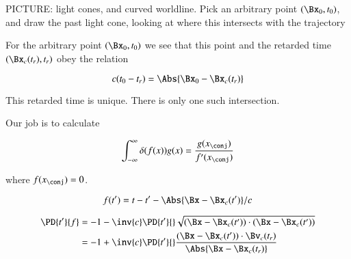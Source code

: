 PICTURE: light cones, and curved worldline.  Pick an arbitrary point $(\Bx_0, t_0)$, and draw the past light cone, looking at where this intersects with the trajectory

For the arbitrary point $(\Bx_0, t_0)$ we see that this point and the retarded time $(\Bx_c(t_r), t_r)$ obey the relation

\begin{equation}\label{eqn:relativisticElectrodynamicsL18:190}
c (t_0 - t_r) = \Abs{\Bx_0 - \Bx_c(t_r)}
\end{equation}

This retarded time is unique.  There is only one such intersection.

Our job is to calculate

\begin{equation}\label{eqn:relativisticElectrodynamicsL18:210}
\int_{-\infty}^\infty \delta(f(x)) g(x) = \frac{g(x_\conj)}{f'(x_\conj)}
\end{equation}

where $f(x_\conj) = 0$.

\begin{equation}\label{eqn:relativisticElectrodynamicsL18:230}
f(t') = t - t' - \Abs{\Bx - \Bx_c(t')}/c
\end{equation}

\begin{align*}
\PD{t'}{f}
&= -1 - \inv{c} \PD{t'}{} \sqrt{ (\Bx - \Bx_c(t')) \cdot (\Bx - \Bx_c(t')) } \\
&= -1 + \inv{c} \PD{t'}{} \frac{(\Bx - \Bx_c(t')) \cdot \Bv_c(t_r)}{\Abs{\Bx - \Bx_c(t_r)}}
\end{align*}

\EndArticle
